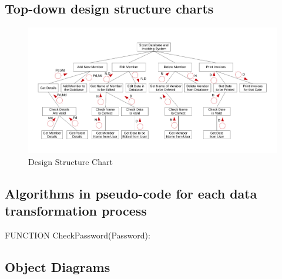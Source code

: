 \subsection{Top-down design structure charts}

\begin{figure}[H]
\includegraphics[width=\textwidth]{./Design/images/Design_Structure_Chart.pdf}
    \caption{Design Structure Chart} \label{fig:Structure_Chart}
\end{figure}

\subsection{Algorithms in pseudo-code for each data transformation process}

\begin{algorithm}[H]
\label{fig:check_username_and_password}
    \caption{FUNCTION CheckPassword(Password):}
\begin{algorithmic}[1]
\Else
{}
\EndIf
\end{algorithmic}
\end{algorithm}

\subsection{Object Diagrams}

